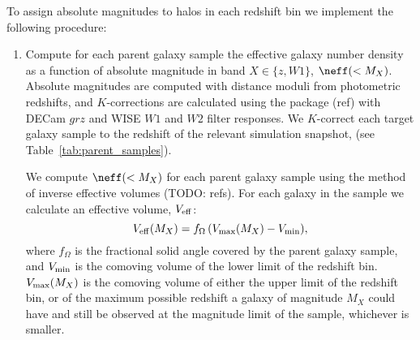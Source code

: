 \documentclass[twocolumn,apj,iop,tighten]{emulateapj2}
\begin{document}
To assign absolute magnitudes to halos in each redshift bin we implement the following procedure:
%
\begin{enumerate}[leftmargin=0pt, itemindent=24pt, listparindent=10pt, label=(\arabic*), nosep]
\item \label{step:neff}
Compute for each parent galaxy sample the effective galaxy number density as a function of absolute magnitude in band ${X \in \{z, W1\}}$, $\neff(<M_X)$. Absolute magnitudes are computed with distance moduli from photometric redshifts, and $K$-corrections are calculated using the \idl package \kcorrect (ref) with DECam $grz$ and WISE $W1$ and $W2$ filter responses. We $K$-correct each target galaxy sample to the redshift of the relevant simulation snapshot, \zsim (see Table~\ref{tab:parent_samples}).

We compute $\neff(<M_X)$ for each parent galaxy sample using the method of inverse effective volumes (TODO: refs). For each galaxy in the sample we calculate an effective volume, $V_{\rm eff}$:
%
\begin{equation}
{V_{\rm eff}(M_X) = f_\Omega \left( V_{\rm max}(M_X)-V_{\rm min} \right)},
\end{equation}
%
\noindent where $f_\Omega$ is the fractional solid angle covered by the parent galaxy sample, and $V_{\rm min}$ is the comoving volume of the lower limit of the redshift bin. $V_{\rm max}(M_X)$ is the comoving volume of either the upper limit of the redshift bin, or of the maximum possible redshift a galaxy of magnitude $M_X$ could have and still be observed at the magnitude limit of the sample, whichever is smaller.


\end{enumerate}
\end{document}
